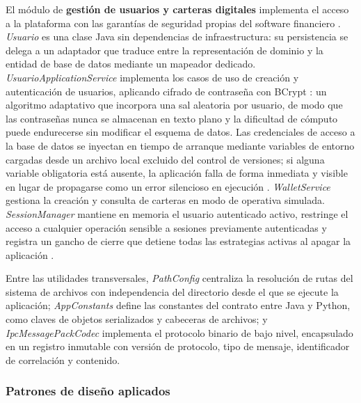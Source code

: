 El módulo de \textbf{gestión de usuarios y carteras digitales} implementa el acceso a la plataforma con las garantías de seguridad propias del software financiero \parencite{owasp_password_2024}. \textit{Usuario} es una clase Java sin dependencias de infraestructura: su persistencia se delega a un adaptador que traduce entre la representación de dominio y la entidad de base de datos mediante un mapeador dedicado. \textit{UsuarioApplicationService} implementa los casos de uso de creación y autenticación de usuarios, aplicando cifrado de contraseña con BCrypt \parencite{provos_bcrypt_1999}: un algoritmo adaptativo que incorpora una sal aleatoria por usuario, de modo que las contraseñas nunca se almacenan en texto plano y la dificultad de cómputo puede endurecerse sin modificar el esquema de datos. Las credenciales de acceso a la base de datos se inyectan en tiempo de arranque mediante variables de entorno cargadas desde un archivo local excluido del control de versiones; si alguna variable obligatoria está ausente, la aplicación falla de forma inmediata y visible en lugar de propagarse como un error silencioso en ejecución \parencite{kleppmann_designing_2017}. \textit{WalletService} gestiona la creación y consulta de carteras en modo de operativa simulada. \textit{SessionManager} mantiene en memoria el usuario autenticado activo, restringe el acceso a cualquier operación sensible a sesiones previamente autenticadas y registra un gancho de cierre que detiene todas las estrategias activas al apagar la aplicación \parencite{gamma_design_1994}.

Entre las utilidades transversales, \textit{PathConfig} centraliza la resolución de rutas del sistema de archivos con independencia del directorio desde el que se ejecute la aplicación; \textit{AppConstants} define las constantes del contrato entre Java y Python, como claves de objetos serializados y cabeceras de archivos; y \textit{IpcMessagePackCodec} implementa el protocolo binario de bajo nivel, encapsulado en un registro inmutable con versión de protocolo, tipo de mensaje, identificador de correlación y contenido.

\subsubsection{Patrones de diseño aplicados}
\label{sec:patrones}

